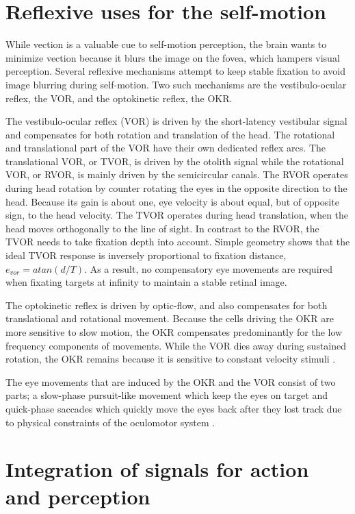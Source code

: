 \section{Reflexive uses for the self-motion}
While vection is a valuable cue to self-motion perception, the brain wants to minimize vection because it blurs the image on the fovea, which hampers visual perception. Several reflexive mechanisms attempt to keep stable fixation to avoid image blurring during self-motion. Two such mechanisms are the vestibulo-ocular reflex, the VOR, and the optokinetic reflex, the OKR.

The vestibulo-ocular reflex (VOR) is driven by the short-latency vestibular signal and compensates for both rotation and translation of the head. The rotational and translational part of the VOR have their own dedicated reflex arcs. The translational VOR, or TVOR, is driven by the otolith signal while the rotational VOR, or RVOR, is mainly driven by the semicircular canals. The RVOR operates during head rotation by counter rotating the eyes in the opposite direction to the head. Because its gain is about one, eye velocity is about equal, but of opposite sign, to the head velocity. The TVOR operates during head translation, when the head moves orthogonally to the line of sight. In contrast to the RVOR, the TVOR needs to take fixation depth into account. Simple geometry shows that the ideal TVOR response is inversely proportional to fixation distance, $e_{vor} = atan⁡(d/T)$. As a result, no compensatory eye movements are required when fixating targets at infinity to maintain a stable retinal image. 

The optokinetic reflex is driven by optic-flow, and also compensates for both translational and rotational movement. Because the cells driving the OKR are more sensitive to slow motion, the OKR compensates predominantly for the low frequency components of movements. While the VOR dies away during sustained rotation, the OKR remains because it is sensitive to constant velocity stimuli \cite{soodak1988}.

The eye movements that are induced by the OKR and the VOR consist of two parts; a slow-phase pursuit-like movement which keep the eyes on target and quick-phase saccades which quickly move the eyes back after they lost track due to physical constraints of the oculomotor system \cite{goldberg2012}.

\section{Integration of signals for action and perception}

